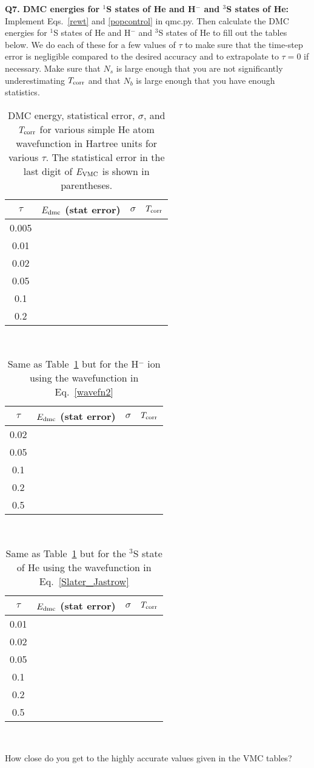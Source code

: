 \documentclass[11pt,aps,prb,amsmath,amssymb,superscriptaddress,notitlepage]{revtex4-1}
\def\Tcorr{T_{\rm corr}}
\providecommand{\tabularnewline}{\\}
\begin{document}
{\color{blue}
\textbf{Q7. DMC energies for $^1$S states of He and H$^-$ and $^3$S states of He:}\\
Implement Eqs.~\ref{rewt} and \ref{popcontrol} in qmc.py.
Then calculate the DMC energies for $^1$S states of He and H$^-$ and $^3$S states of He to fill out the
tables below.  We do each of these for a few values of $\tau$ to make sure that the time-step error is
negligible compared to the desired accuracy and to extrapolate to $\tau=0$ if necessary.
Make sure that $N_s$ is large enough that you are not significantly underestimating $\Tcorr$
and that $N_b$ is large enough that you have enough statistics.

\begin{table}[H]
\begin{center}
\color{blue}
\caption{DMC energy, statistical error, $\sigma$, and $\Tcorr$ for various simple He atom wavefunction
in Hartree units for various $\tau$. The statistical error in the last digit of $E_{\rm VMC}$ is shown in parentheses.}
\label{He_DMC}
\begin{tabular}{|c|c|c|c|}
\hline 
$\tau$ & \multicolumn{1}{c}{$E_{\rm dmc}$ (stat error)} | & $\sigma$ & $\Tcorr$ \tabularnewline
\hline 
0.005&  &  & \tabularnewline
0.01 &  &  & \tabularnewline
0.02 &  &  & \tabularnewline
0.05 &  &  & \tabularnewline
0.1 &  &  & \tabularnewline
0.2 &  &  & \tabularnewline
\hline 
\end{tabular}\\
\end{center}
\end{table}


\begin{table}[H]
\begin{center}
\color{blue}
\caption{Same as Table~\ref{He_DMC} but for the H$^-$ ion using the wavefunction in Eq.~\ref{wavefn2}}
\label{H-_DMC}
\begin{tabular}{|c|c|c|c|}
\hline 
$\tau$ & \multicolumn{1}{c}{$E_{\rm dmc}$ (stat error)} | & $\sigma$ & $\Tcorr$ \tabularnewline
\hline 
0.02 &  &  & \tabularnewline
0.05 &  &  & \tabularnewline
0.1 &  &  & \tabularnewline
0.2 &  &  & \tabularnewline
0.5 &  &  & \tabularnewline
\hline 
\end{tabular}\\
\end{center}
\end{table}


\begin{table}[H]
\begin{center}
\color{blue}
\caption{Same as Table~\ref{He_DMC} but for the $^3$S state of He using the wavefunction in Eq.~\ref{Slater_Jastrow}}
\label{H-_DMC}
\begin{tabular}{|c|c|c|c|}
\hline 
$\tau$ & \multicolumn{1}{c}{$E_{\rm dmc}$ (stat error)} | & $\sigma$ & $\Tcorr$ \tabularnewline
\hline 
0.01 &  &  & \tabularnewline
0.02 &  &  & \tabularnewline
0.05 &  &  & \tabularnewline
0.1 &  &  & \tabularnewline
0.2 &  &  & \tabularnewline
0.5 &  &  & \tabularnewline
\hline 
\end{tabular}\\
\end{center}
\end{table}

How close do you get to the highly accurate values given in the VMC tables?

}
\end{document}
